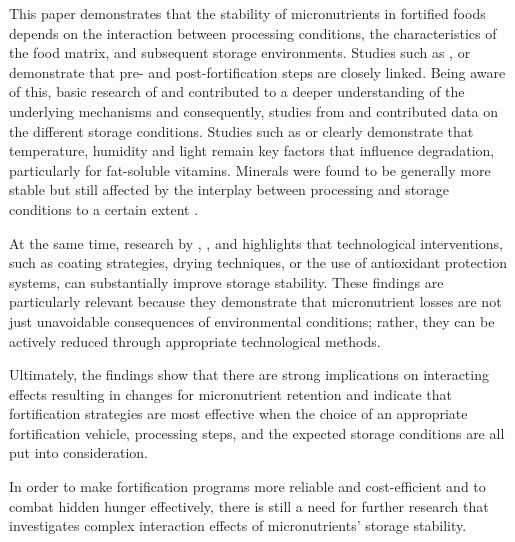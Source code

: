 This paper demonstrates that the stability of micronutrients in fortified foods depends on the interaction between processing conditions, the characteristics of the food matrix, and subsequent storage environments. Studies such as \citet{chepkoech}, \citet{noodle} or \citet{gari} demonstrate that pre- and post-fortification steps are closely linked. Being aware of this, basic research of \citet{li2coatsalt} and \citet{li3capsalt} contributed to a deeper understanding of the underlying mechanisms and consequently, studies from \citet{chepkoech} and \citet{sharma} contributed data on the different storage conditions. Studies such as \citet{li5cocoyam} or \citet{chepkoech} clearly demonstrate that temperature, humidity and light remain key factors that influence degradation, particularly for fat-soluble vitamins. Minerals were found to be generally more stable but still affected by the interplay between processing and storage conditions to a certain extent \autocite{saha}.
\par 
 At the same time, research by \citet{sharma}, \citet{li5cocoyam}, \citet{kumari} and \citet{saha} highlights that technological interventions, such as coating strategies, drying techniques, or the use of antioxidant protection systems, can substantially improve storage stability. These findings are particularly relevant because they demonstrate that micronutrient losses are not just unavoidable consequences of environmental conditions; rather, they can be actively reduced through appropriate technological methods.
\par  
Ultimately, the findings show that there are strong implications on interacting effects resulting in changes for micronutrient retention and indicate that fortification strategies are most effective when the choice of an appropriate fortification vehicle, processing steps, and the expected storage conditions are all put into consideration. 
\par 
In order to make fortification programs more reliable and cost-efficient and to combat hidden hunger effectively, there is still a need for further research that investigates complex interaction effects of micronutrients’ storage stability. 
